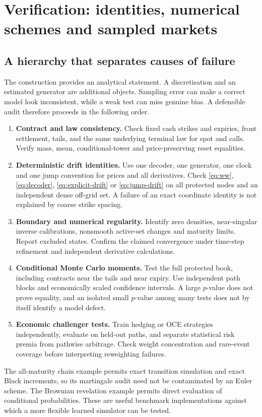 \documentclass[11pt,a4paper]{article}
\numberwithin{equation}{section}
\theoremstyle{definition}\newtheorem{definition}[theorem]{Definition}
\theoremstyle{remark}\newtheorem{remark}[theorem]{Remark}
\begin{document}
\section{Verification: identities, numerical schemes and sampled markets}
\label{sec:testing}
\subsection{A hierarchy that separates causes of failure}
The construction provides an analytical statement. A discretisation and an estimated generator are additional objects. Sampling error can make a correct model look inconsistent, while a weak test can miss genuine bias. A defensible audit therefore proceeds in the following order.
\begin{enumerate}[label=\textbf{\arabic*.},leftmargin=*]
\item \textbf{Contract and law consistency.} Check fixed cash strikes and expiries, front settlement, tails, and the same underlying terminal law for spot and calls. Verify mass, mean, conditional-tower and price-preserving reset equalities.
\item \textbf{Deterministic drift identities.} Use one decoder, one generator, one clock and one jump convention for prices and all derivatives. Check \eqref{eq:ww}, \eqref{eq:decoder}, \eqref{eq:explicit-drift} or \eqref{eq:jump-drift} on all protected nodes and an independent dense off-grid set. A failure of an exact coordinate identity is not explained by coarse strike spacing.
\item \textbf{Boundary and numerical regularity.} Identify zero densities, near-singular inverse calibrations, nonsmooth active-set changes and maturity limits. Report excluded states. Confirm the claimed convergence under time-step refinement and independent derivative calculations.
\item \textbf{Conditional Monte Carlo moments.} Test the full protected book, including contracts near the tails and near expiry. Use independent path blocks and economically scaled confidence intervals. A large $p$-value does not prove equality, and an isolated small $p$-value among many tests does not by itself identify a model defect.
\item \textbf{Economic challenger tests.} Train hedging or OCE strategies independently, evaluate on held-out paths, and separate statistical risk premia from pathwise arbitrage. Check weight concentration and rare-event coverage before interpreting reweighting failures.
\end{enumerate}
The all-maturity chain example permits exact transition simulation and exact Black increments, so its martingale audit need not be contaminated by an Euler scheme. The Brownian revelation example permits direct evaluation of conditional probabilities. These are useful benchmark implementations against which a more flexible learned simulator can be tested.
\end{document}
